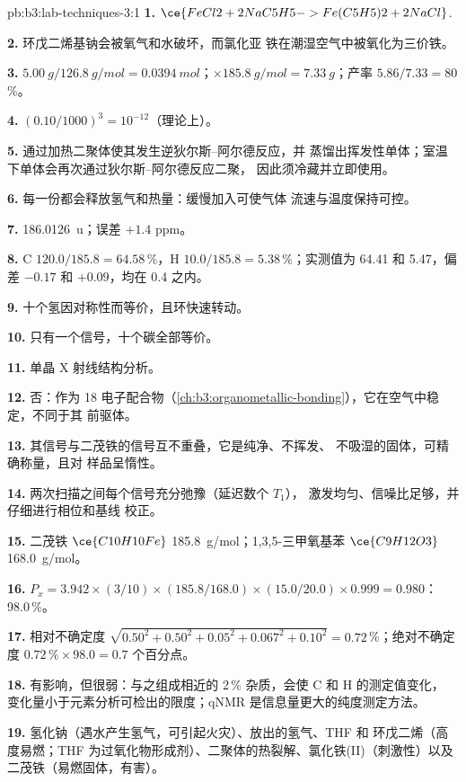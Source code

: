 \begin{solution}{pb:b3:lab-techniques-3:1}
\textbf{1.} $\ce{FeCl2 + 2NaC5H5 -> Fe(C5H5)2 + 2NaCl}$.

\textbf{2.} 环戊二烯基钠会被氧气和水破坏，而氯化亚
铁在潮湿空气中被氧化为三价铁。

\textbf{3.} $\qty{5.00}{g}/\qty{126.8}{g/mol} = \qty{0.0394}{mol}$；$\times \qty{185.8}{g/mol} = \qty{7.33}{g}$；产率 $5.86/7.33 = 80$\,\%。

\textbf{4.} $(0.10/1000)^3 = 10^{-12}$（理论上）。

\textbf{5.} 通过加热二聚体使其发生逆狄尔斯–阿尔德反应，并
蒸馏出挥发性单体；室温下单体会再次通过狄尔斯–阿尔德反应二聚，
因此须冷藏并立即使用。

\textbf{6.} 每一份都会释放氢气和热量：缓慢加入可使气体
流速与温度保持可控。

\textbf{7.} \qty{186.0126}{u}；误差 $+1.4$ ppm。

\textbf{8.} C $120.0/185.8 = 64.58$\,\%，H $10.0/185.8 = 5.38$\,\%；实测值为 64.41 和 5.47，偏差 $-0.17$ 和 $+0.09$，均在 0.4 之内。

\textbf{9.} 十个氢因对称性而等价，且环快速转动。

\textbf{10.} 只有一个信号，十个碳全部等价。

\textbf{11.} 单晶 X 射线结构分析。

\textbf{12.} 否：作为 18 电子配合物（\cref{ch:b3:organometallic-bonding}），它在空气中稳定，不同于其
前驱体。

\textbf{13.} 其信号与二茂铁的信号互不重叠，它是纯净、不挥发、
不吸湿的固体，可精确称量，且对
样品呈惰性。

\textbf{14.} 两次扫描之间每个信号充分弛豫（延迟数个 $T_1$），
激发均匀、信噪比足够，并仔细进行相位和基线
校正。

\textbf{15.} 二茂铁 $\ce{C10H10Fe}$ \qty{185.8}{g/mol}；1,3,5-三甲氧基苯 $\ce{C9H12O3}$ \qty{168.0}{g/mol}。

\textbf{16.} $P_x = 3.942 \times (3/10) \times (185.8/168.0) \times (15.0/20.0) \times 0.999 = 0.980$：98.0\,\%。

\textbf{17.} 相对不确定度 $\sqrt{0.50^2 + 0.50^2 + 0.05^2 + 0.067^2 + 0.10^2} = 0.72$\,\%；绝对不确定度 $0.72\,\% \times 98.0 = 0.7$ 个百分点。

\textbf{18.} 有影响，但很弱：与之组成相近的 2\,\% 杂质，会使 C 和 H 的测定值变化，
变化量小于元素分析可检出的限度；qNMR 是信息量更大的纯度测定方法。

\textbf{19.} 氢化钠（遇水产生氢气，可引起火灾）、放出的氢气、THF 和
环戊二烯（高度易燃；THF 为过氧化物形成剂）、二聚体的热裂解、氯化铁(II)（刺激性）以及
二茂铁（易燃固体，有害）。


\end{solution}
